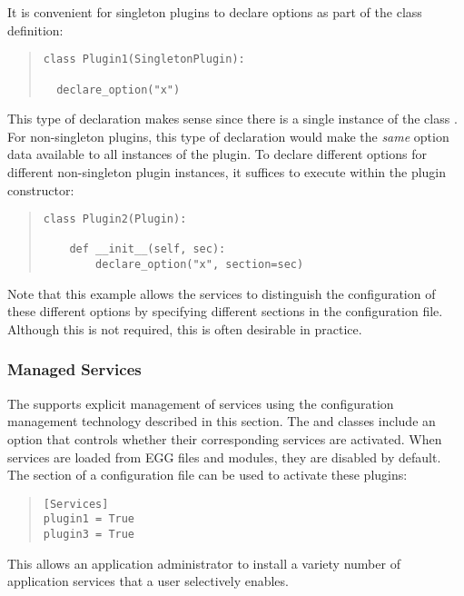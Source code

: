 It is convenient for singleton plugins to declare options as part of the class definition:
\begin{quotation}
\begin{lstlisting}
class Plugin1(SingletonPlugin):

  declare_option("x")
\end{lstlisting}
\end{quotation}
This type of declaration makes sense since there is a single instance of the class .
For non-singleton plugins, this type of declaration would make the \textit{same} option data
available to all instances of the plugin.  To declare different options for different 
non-singleton plugin instances, it suffices to execute  within the
plugin constructor:
\begin{quotation}
\begin{lstlisting}
class Plugin2(Plugin):

    def __init__(self, sec):
        declare_option("x", section=sec)
\end{lstlisting}
\end{quotation}
Note that this example allows the  services to distinguish the configuration of
these different  options by specifying different sections in the configuration file.
Although this is not required, this is often desirable in practice.


\subsubsection{Managed Services}

The \pcasp supports explicit management of services using the configuration management
technology described in this section.  The  and 
classes include an  option that controls whether their corresponding
services are activated.  When services are loaded from EGG files and modules, they
are disabled by default.  The  section of a configuration file can
be used to activate these plugins:
\begin{quotation}
\begin{lstlisting}
[Services]
plugin1 = True
plugin3 = True
\end{lstlisting}
\end{quotation}
This allows an application administrator to install a variety number of application
services that a user selectively enables.


